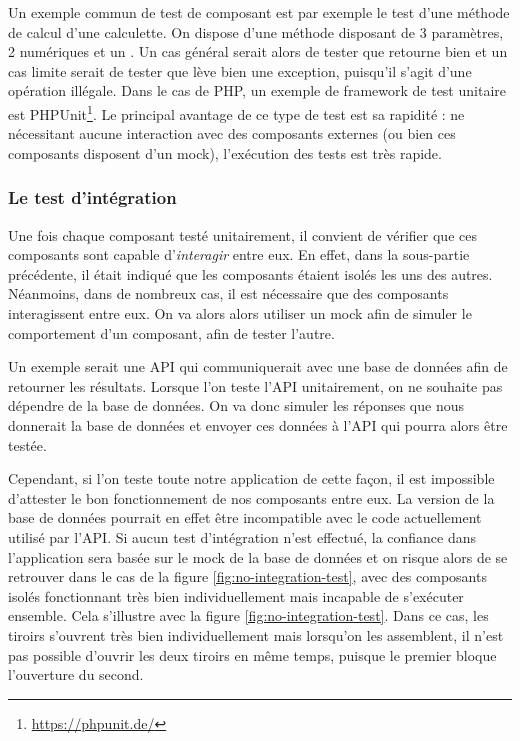 Un exemple commun de test de composant est par exemple le test d'une méthode de calcul d'une calculette. On dispose d'une méthode  disposant de 3 paramètres, 2  numériques et un . Un cas général serait alors de tester que  retourne bien  et un cas limite serait de tester que  lève bien une exception, puisqu'il s'agit d'une opération illégale. Dans le cas de \gls{PHP}, un exemple de \gls{framework} de test unitaire est PHPUnit\footnote{\url{https://phpunit.de/}}. Le principal avantage de ce type de test est sa rapidité : ne nécessitant aucune interaction avec des composants externes (ou bien ces composants disposent d'un \gls{mock}), l'exécution des tests est très rapide.

\subsubsection{Le test d'intégration}

Une fois chaque composant testé unitairement, il convient de vérifier que ces composants sont capable d'\emph{interagir} entre eux. En effet, dans la sous-partie précédente, il était indiqué que les composants étaient isolés les uns des autres. Néanmoins, dans de nombreux cas, il est nécessaire que des composants interagissent entre eux. On va alors alors utiliser un \gls{mock} afin de simuler le comportement d'un composant, afin de tester l'autre.

Un exemple serait une \gls{API} qui communiquerait avec une base de données afin de retourner les résultats. Lorsque l'on teste l'\gls{API} unitairement, on ne souhaite pas dépendre de la base de données. On va donc simuler les réponses que nous donnerait la base de données et envoyer ces données à l'\gls{API} qui pourra alors être testée.

Cependant, si l'on teste toute notre application de cette façon, il est impossible d'attester le bon fonctionnement de nos composants entre eux. La version de la base de données pourrait en effet être incompatible avec le code actuellement utilisé par l'\gls{API}. Si aucun test d'intégration n'est effectué, la confiance dans l'application sera basée sur le \gls{mock} de la base de données et on risque alors de se retrouver dans le cas de la figure \ref{fig:no-integration-test}, avec des composants isolés fonctionnant très bien individuellement mais incapable de s'exécuter ensemble. Cela s'illustre avec la figure \ref{fig:no-integration-test}. Dans ce cas, les tiroirs s'ouvrent très bien individuellement mais lorsqu'on les assemblent, il n'est pas possible d'ouvrir les deux tiroirs en même temps, puisque le premier bloque l'ouverture du second.


